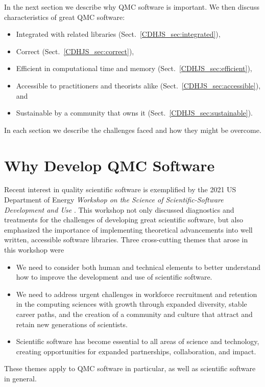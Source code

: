 \documentclass[graybox]{svmult}
\begin{document}
In the next section we describe why QMC software is important.  We then discuss characteristics of great QMC software:

\begin{itemize}
\item Integrated with related libraries (Sect.\ \ref{CDHJS_sec:integrated}),

\item Correct (Sect.\ \ref{CDHJS_sec:correct}),

\item Efficient in computational time and memory (Sect.\ \ref{CDHJS_sec:efficient}),

\item Accessible to practitioners and theorists alike (Sect.\ \ref{CDHJS_sec:accessible}), and

\item Sustainable by a community that owns it (Sect.\ \ref{CDHJS_sec:sustainable}).

\end{itemize}

In each section we describe the challenges faced and how they might be overcome.



\section{Why Develop QMC Software} \label{CDHJS_sec:why_we_need_software}

Recent interest in quality scientific software is exemplified by the 2021 US Department of Energy \emph{Workshop on the Science of Scientific-Software Development and Use} \cite{ASCR-SSSDU,osti_1846008}. This workshop not only discussed diagnostics and treatments for the challenges of developing great scientific software, but also emphasized the importance of implementing theoretical advancements into well written, accessible software libraries. Three cross-cutting themes that arose in this workshop were
\begin{itemize}
    \item  We need to consider both human and technical elements to better understand how to improve the development and use of scientific software.

    \item We need to address urgent challenges in workforce recruitment and retention in the computing sciences with growth through expanded diversity, stable career paths, and the creation of a community and culture that attract and retain new generations of scientists.

    \item Scientific software has become essential to all areas of science and technology, creating opportunities for expanded partnerships, collaboration, and impact.
\end{itemize}
These themes apply to QMC software in particular, as well as scientific software in general.
\end{document}
